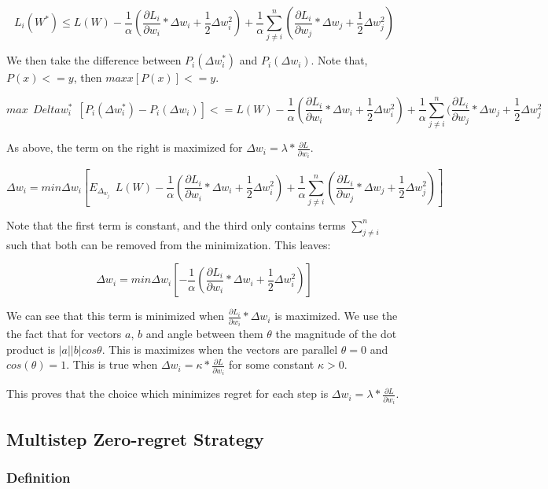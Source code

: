 \documentclass{article}
\begin{document}
\[ L_i(W^*) \leq L(W) - \frac{1}{\alpha} (\frac{\partial L_i}{\partial w_i} * \Delta w_i + \frac{1}{2} \Delta w_i^2) + \frac{1}{\alpha} \sum_{j \neq i}^{n} (\frac{\partial L_i}{\partial w_j} * \Delta w_j + \frac{1}{2} \Delta w_j^2)  \]


We then take the difference between $P_i(\Delta w_i^*)$ and $P_i(\Delta w_i)$. Note that, $P(x) <= y$, then $max x [ P(x) ] <= y$.

\[ max \ \ Delta w_i^* \ \ [P_i(\Delta w_i^*) - P_i(\Delta w_i)] <= L(W) - \frac{1}{\alpha} (\frac{\partial L_i}{\partial w_i} * \Delta w_i + \frac{1}{2} \Delta w_i^2) + \frac{1}{\alpha} \sum_{j \neq i}^{n} (\frac{\partial L_i}{\partial w_j} * \Delta w_j + \frac{1}{2} \Delta w_j^2 \]

As above, the term on the right is maximized for $\Delta w_i = \lambda * \frac{\partial L}{\partial w_i}$.



\[ \Delta w_i = min \Delta w_i [ E_\Delta_w_j \ \ L(W) - \frac{1}{\alpha} (\frac{\partial L_i}{\partial w_i} * \Delta w_i + \frac{1}{2} \Delta w_i^2) + \frac{1}{\alpha} \sum_{j \neq i}^{n} (\frac{\partial L_i}{\partial w_j} * \Delta w_j + \frac{1}{2} \Delta w_j^2) ]\] 

Note that the first term is constant, and the third only contains terms $\sum_{j \neq i}^{n}$ such that both can be removed from the minimization. This leaves:

\[ \Delta w_i = min \Delta w_i [ - \frac{1}{\alpha} (\frac{\partial L_i}{\partial w_i} * \Delta w_i + \frac{1}{2} \Delta w_i^2) ] \]

We can see that this term is minimized when $\frac{\partial L_i}{\partial w_i} * \Delta w_i$ is maximized. We use the the fact that for vectors $a$, $b$ and angle between them $\theta$ the magnitude of the dot product is $|a||b|cos \theta$. This is maximizes when the vectors are parallel $\theta = 0$ and $cos(\theta) = 1$. This is true when $\Delta w_i = \kappa* \frac{\partial L}{\partial w_i}$ for some constant $\kappa > 0$.

This proves that the choice which minimizes regret for each step is $\Delta w_i = \lambda * \frac{\partial L}{\partial w_i}$.

\subsection{Multistep Zero-regret Strategy}

\subsubsection{Definition}
\end{document}
